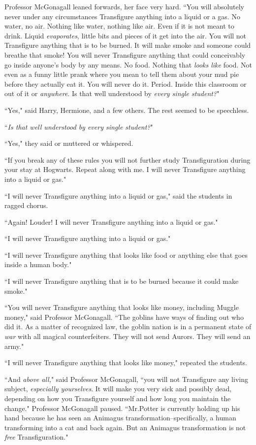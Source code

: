 Professor McGonagall leaned forwards, her face very hard. ``You will absolutely never under any circumstances Transfigure anything into a liquid or a gas. No water, no air. Nothing like water, nothing like air. Even if it is not meant to drink. Liquid \emph{evaporates}, little bits and pieces of it get into the air. You will not Transfigure anything that is to be burned. It will make smoke and someone could breathe that smoke! You will never Transfigure anything that could conceivably go inside anyone's body by any means. No food. Nothing that \emph{looks like} food. Not even as a funny little prank where you mean to tell them about your mud pie before they actually eat it. You will never do it. Period. Inside this classroom or out of it or \emph{anywhere}. Is that well understood by \emph{every single student?}"

``Yes," said Harry, Hermione, and a few others. The rest seemed to be speechless.

``\emph{Is that well understood by every single student?}"

``Yes," they said or muttered or whispered.

``If you break any of these rules you will not further study Transfiguration during your stay at Hogwarts. Repeat along with me. I will never Transfigure anything into a liquid or gas."

``I will never Transfigure anything into a liquid or gas," said the students in ragged chorus.

``Again! Louder! I will never Transfigure anything into a liquid or gas."

``I will never Transfigure anything into a liquid or gas."

``I will never Transfigure anything that looks like food or anything else that goes inside a human body."

``I will never Transfigure anything that is to be burned because it could make smoke."

``You will never Transfigure anything that looks like money, including Muggle money," said Professor McGonagall. ``The goblins have ways of finding out who did it. As a matter of recognized law, the goblin nation is in a permanent state of \emph{war} with all magical counterfeiters. They will not send Aurors. They will send an army."

``I will never Transfigure anything that looks like money," repeated the students.

``And \emph{above all,}" said Professor McGonagall, ``you will not Transfigure any living subject, \emph{especially yourselves}. It will make you very sick and possibly dead, depending on how you Transfigure yourself and how long you maintain the change." Professor McGonagall paused. ``Mr.\?Potter is currently holding up his hand because he has seen an Animagus transformation\---specifically, a human transforming into a cat and back again. But an Animagus transformation is not \emph{free} Transfiguration."

